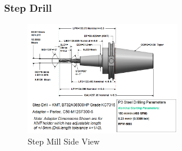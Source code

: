 \pagebreak

\subsubsection{Step Drill}

\begin{figure}[ht]
  \centering
  \includegraphics[width=0.6\textwidth]{figures/a9-step-drill-side-view.png}
  \caption{Step Mill Side View}
  \label{fig:a9-step-drill-side-view}
\end{figure}
\FloatBarrier

